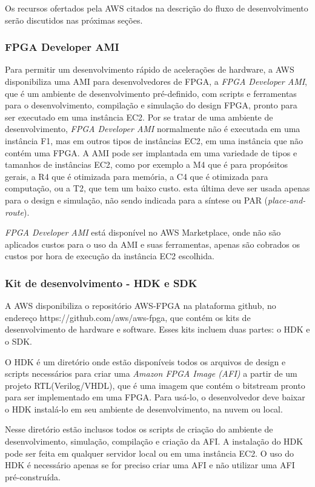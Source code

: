 Os recursos ofertados pela AWS citados na descrição do fluxo de desenvolvimento serão discutidos nas próximas seções.

\subsubsection{ FPGA Developer AMI} \label{sec:ami}

Para permitir um desenvolvimento rápido de acelerações de hardware, a AWS disponibiliza uma AMI para desenvolvedores de FPGA, a \textit{FPGA Developer AMI}, que é um ambiente de desenvolvimento pré-definido, com scripts e ferramentas para o desenvolvimento, compilação e simulação do design FPGA, pronto para ser executado em uma instância EC2. Por se tratar de uma ambiente de desenvolvimento, \textit{FPGA Developer AMI} normalmente não é executada em uma instância F1, mas em outros tipos de instâncias EC2, em uma instância que não contém uma FPGA. A AMI pode ser implantada em uma variedade de tipos e tamanhos de instâncias EC2, como por exemplo a M4 que é para propósitos gerais, a R4 que é otimizada para memória, a C4 que é otimizada para computação, ou a T2, que tem um baixo custo. esta última deve ser usada apenas para o design e simulação, não sendo indicada para a síntese ou PAR (\textit{place-and-route}).

\textit{FPGA Developer AMI} está disponível no AWS Marketplace, onde não são aplicados custos para o uso da AMI e suas ferramentas, apenas são cobrados os custos por hora de execução da instância EC2 escolhida.


\subsubsection{Kit de desenvolvimento - HDK e SDK} \label{sec:hdk}
    
    A AWS disponibiliza o repositório AWS-FPGA na plataforma github, no endereço https://github.com/aws/aws-fpga, que contém os kits de desenvolvimento de hardware e software. Esses kits incluem duas partes: o HDK e o SDK.
    
    O HDK é um diretório onde estão disponíveis todos os arquivos de design e scripts necessários para criar uma \textit{Amazon FPGA Image (AFI)} a partir de um projeto RTL(Verilog/VHDL), que é uma imagem que contém o bitstream pronto para ser implementado em uma FPGA. Para usá-lo, o desenvolvedor deve baixar o HDK instalá-lo em seu ambiente de desenvolvimento, na nuvem ou local.
    
    Nesse diretório estão inclusos todos os scripts de criação do ambiente de desenvolvimento, simulação, compilação e criação da AFI. A instalação do HDK pode ser feita em qualquer servidor local ou em uma instância EC2. O uso do HDK é necessário apenas se for preciso criar uma AFI e não utilizar uma AFI pré-construída.
    
